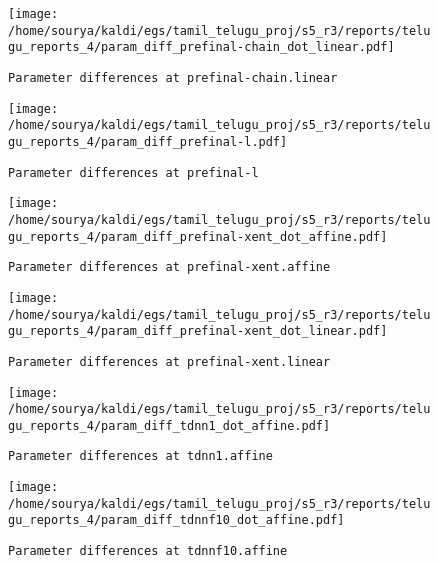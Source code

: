 \documentclass[prl,10pt,twocolumn]{revtex4}
\begin{document}
\newpage
\begin{figure}[h]
  \begin{center}
    \caption{\texttt{Parameter differences at prefinal-chain.linear}}
    \texttt{[image: /home/sourya/kaldi/egs/tamil\_telugu\_proj/s5\_r3/reports/telugu\_reports\_4/param\_diff\_prefinal-chain\_dot\_linear.pdf]}
  \end{center}
\end{figure}
\clearpage


\newpage
\begin{figure}[h]
  \begin{center}
    \caption{\texttt{Parameter differences at prefinal-l}}
    \texttt{[image: /home/sourya/kaldi/egs/tamil\_telugu\_proj/s5\_r3/reports/telugu\_reports\_4/param\_diff\_prefinal-l.pdf]}
  \end{center}
\end{figure}
\clearpage


\newpage
\begin{figure}[h]
  \begin{center}
    \caption{\texttt{Parameter differences at prefinal-xent.affine}}
    \texttt{[image: /home/sourya/kaldi/egs/tamil\_telugu\_proj/s5\_r3/reports/telugu\_reports\_4/param\_diff\_prefinal-xent\_dot\_affine.pdf]}
  \end{center}
\end{figure}
\clearpage


\newpage
\begin{figure}[h]
  \begin{center}
    \caption{\texttt{Parameter differences at prefinal-xent.linear}}
    \texttt{[image: /home/sourya/kaldi/egs/tamil\_telugu\_proj/s5\_r3/reports/telugu\_reports\_4/param\_diff\_prefinal-xent\_dot\_linear.pdf]}
  \end{center}
\end{figure}
\clearpage


\newpage
\begin{figure}[h]
  \begin{center}
    \caption{\texttt{Parameter differences at tdnn1.affine}}
    \texttt{[image: /home/sourya/kaldi/egs/tamil\_telugu\_proj/s5\_r3/reports/telugu\_reports\_4/param\_diff\_tdnn1\_dot\_affine.pdf]}
  \end{center}
\end{figure}
\clearpage


\newpage
\begin{figure}[h]
  \begin{center}
    \caption{\texttt{Parameter differences at tdnnf10.affine}}
    \texttt{[image: /home/sourya/kaldi/egs/tamil\_telugu\_proj/s5\_r3/reports/telugu\_reports\_4/param\_diff\_tdnnf10\_dot\_affine.pdf]}
  \end{center}
\end{figure}
\clearpage
\end{document}
